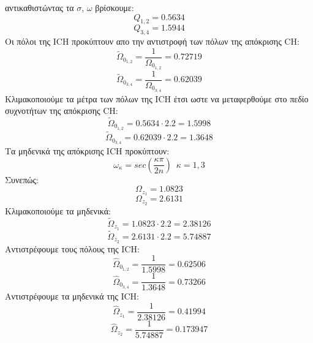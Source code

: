 \documentclass{article}
\begin{document}
{αντικαθιστώντας τα $σ$, $ω$ βρίσκουμε:
\begin{equation*}
\boxed{Q_{1,2} =  0.5634}
\end{equation*}
\begin{equation*}
\boxed{Q_{3,4} =  1.5944}
\end{equation*}
Οι πόλοι της ICH προκύπτουν απο την αντιστροφή των πόλων της απόκρισης CH: 
\begin{equation*}
\tilde{Ω}_{0_{1,2}} = \frac{1}{Ω_{0_{1,2}}} = 0.72719
\end{equation*}
\begin{equation*}
\tilde{Ω}_{0_{3,4}} = \frac{1}{Ω_{0_{3,4}}} = 0.62039
\end{equation*}
Κλιμακοποιούμε τα μέτρα των πόλων της ICH έτσι ωστε να μεταφερθούμε στο πεδίο συχνοτήτων της απόκρισης CH:
\begin{equation*}
\tilde{Ω}_{0_{1,2}} = 0.5634 \cdot 2.2 = 1.5998
\end{equation*}
\begin{equation*}
\tilde{Ω}_{0_{3,4}} =  0.62039 \cdot 2.2 = 1.3648
\end{equation*}
Τα μηδενικά της απόκρισης ICH προκύπτουν:
\begin{equation*}
ω_κ = sec(\frac{κπ}{2n}) \enspace κ = 1,3
\end{equation*}
Συνεπώς:
\begin{equation*}
Ω_{z_1} = 1.0823
\end{equation*}
\begin{equation*}
Ω_{z_2} = 2.6131
\end{equation*}
Κλιμακοποιούμε τα μηδενικά:
\begin{equation*}
\tilde{Ω}_{z_1} = 1.0823 \cdot 2.2 = 2.38126
\end{equation*}
\begin{equation*}
\tilde{Ω}_{z_2} =2.6131 \cdot 2.2 = 5.74887
\end{equation*}
Αντιστρέφουμε τους πόλους της ICH:
\begin{equation*}
\hat{Ω}_{0_{1,2}} = \frac{1}{1.5998} = 0.62506
\end{equation*}
\begin{equation*}
\hat{Ω}_{0_{3,4}} = \frac{1}{1.3648} = 0.73266
\end{equation*}
Αντιστρέφουμε τα μηδενικά της ICH:
\begin{equation*}
\hat{Ω}_{z_1} =\frac{1}{2.38126} =0.41994
\end{equation*}
\begin{equation*}
\hat{Ω}_{z_2} =\frac{1}{5.74887} =0.173947

\end{equation*}}
\end{document}
